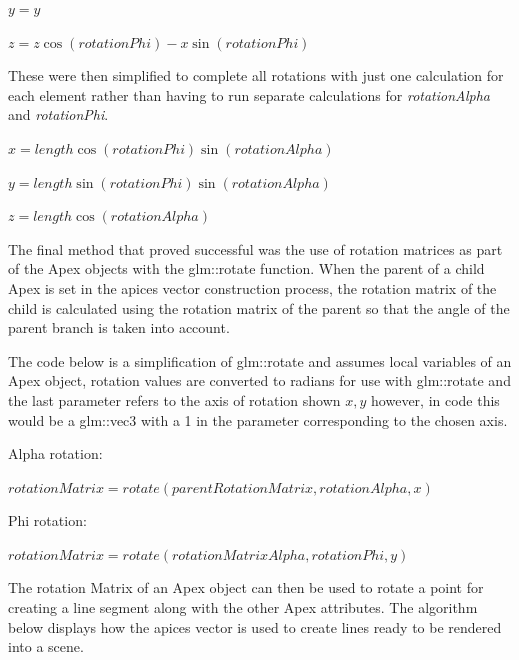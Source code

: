 \documentclass[final]{cmpreport}
\begin{document}
$y = y$

$z = z\cos(rotationPhi) - x\sin(rotationPhi)$

These were then simplified to complete all rotations with just one calculation for each element 
rather than having to run separate calculations for \emph{rotationAlpha} and \emph{rotationPhi}.

$x = length\cos(rotationPhi)\sin(rotationAlpha)$

$y = length\sin(rotationPhi)\sin(rotationAlpha)$

$z = length\cos(rotationAlpha)$

The final method that proved successful was the use of rotation matrices as part of the Apex 
objects with the glm::rotate function. When the parent of a child Apex is set in the apices vector 
construction process, the rotation matrix of the child is calculated using the rotation matrix 
of the parent so that the angle of the parent branch is taken into account. 

The code below is a simplification of glm::rotate and assumes local variables of an 
Apex object, rotation values are converted to radians for use with glm::rotate and the last 
parameter refers to the axis of rotation shown $x, y$ however, in code this would be 
a glm::vec3 with a 1 in the parameter corresponding to the chosen axis.

Alpha rotation:

$rotationMatrix = rotate(parentRotationMatrix, rotationAlpha, x)$

Phi rotation:

$rotationMatrix = rotate(rotationMatrixAlpha, rotationPhi, y)$

The rotation Matrix of an Apex object can then be used to rotate a point for creating a line 
segment along with the other Apex attributes. The algorithm below displays how the apices 
vector is used to create lines ready to be rendered into a scene.
\end{document}
